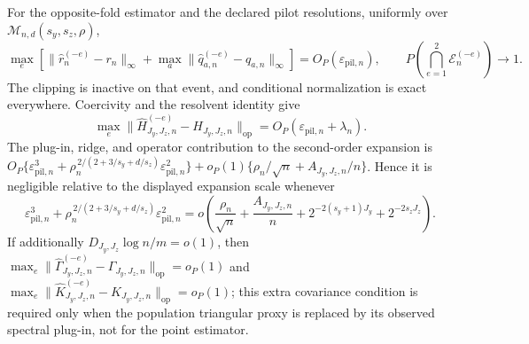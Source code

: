 For the opposite-fold estimator and the declared pilot resolutions, uniformly over \(\mathcal M_{n,d}(s_y,s_z,\rho)\),
\[
\max_e\left[\|\widehat r_n^{(-e)}-r_n\|_\infty+\max_a\|\widehat q_{a,n}^{(-e)}-q_{a,n}\|_\infty\right]=O_P(\varepsilon_{\mathrm{pil},n}),\qquad P\left(\bigcap_{e=1}^2\mathcal E_n^{(-e)}\right)\to1.
\]
The clipping is inactive on that event, and conditional normalization is exact everywhere. Coercivity and the resolvent identity give
\[
\max_e\|\widehat H_{J_y,J_z,n}^{(-e)}-H_{J_y,J_z,n}\|_{\mathrm{op}}=O_P(\varepsilon_{\mathrm{pil},n}+\lambda_n).
\]
The plug-in, ridge, and operator contribution to the second-order expansion is \(O_P\{\varepsilon_{\mathrm{pil},n}^3+\rho_n^{\,2/(2+3/s_y+d/s_z)}\varepsilon_{\mathrm{pil},n}^2\}+o_P(1)\{\rho_n/\sqrt n+A_{J_y,J_z,n}/n\}\). Hence it is negligible relative to the displayed expansion scale whenever
\[
\varepsilon_{\mathrm{pil},n}^3+\rho_n^{\,2/(2+3/s_y+d/s_z)}\varepsilon_{\mathrm{pil},n}^2=o\!\left(\frac{\rho_n}{\sqrt n}+\frac{A_{J_y,J_z,n}}n+2^{-2(s_y+1)J_y}+2^{-2s_zJ_z}\right).
\]
If additionally \(D_{J_y,J_z}\log n/m=o(1)\), then \(\max_e\|\widehat\Gamma_{J_y,J_z,n}^{(-e)}-\Gamma_{J_y,J_z,n}\|_{\mathrm{op}}=o_P(1)\) and \(\max_e\|\widehat K_{J_y,J_z,n}^{(-e)}-K_{J_y,J_z,n}\|_{\mathrm{op}}=o_P(1)\); this extra covariance condition is required only when the population triangular proxy is replaced by its observed spectral plug-in, not for the point estimator.